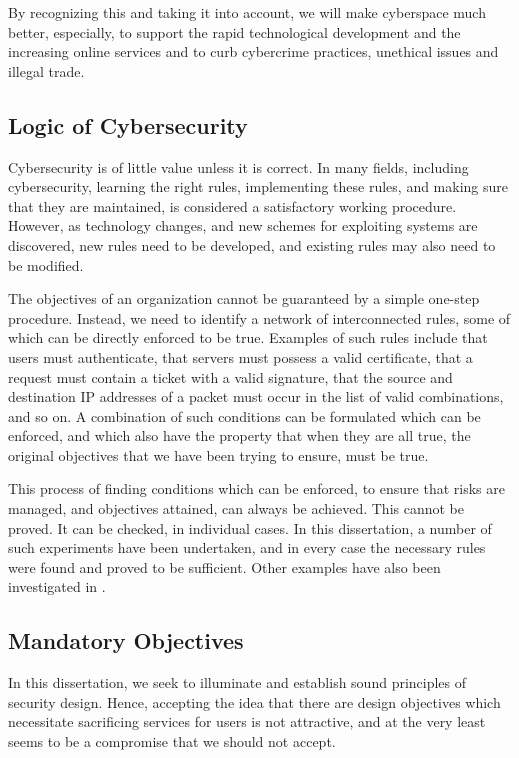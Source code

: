 By recognizing this and taking it into account, we will make cyberspace much better, especially,  to support the rapid technological development and the increasing online services and to curb cybercrime practices, unethical  issues and illegal trade.

\subsection{Logic of Cybersecurity}
 
Cybersecurity is of little value unless it is correct. In many fields,
including cybersecurity, learning the right rules, implementing
these rules, and making sure that they are maintained, is considered
a satisfactory working procedure. However, as technology changes, and
new schemes for exploiting systems are discovered, new rules need to be
developed, and existing rules may also need to be modified.

The objectives of an organization cannot be guaranteed by a simple
one-step procedure. Instead, we need to identify a network of
interconnected rules, some of which can be directly enforced to be
true. Examples of such rules include that users must authenticate, that
servers must possess a valid certificate, that a request must contain
a ticket with a valid signature, that the source and destination IP
addresses of a packet must occur in the list of valid combinations, and
so on. A combination of such conditions can be formulated which can be
enforced, and which also have the property that when they are all true,
the original objectives that we have been trying to ensure, must be true.

This process of finding conditions which can be enforced, to ensure
that risks are managed, and objectives attained, can always be
achieved. This cannot be proved. It can be checked, in individual
cases. In this dissertation,  a number of such experiments have been
undertaken, and in every case the necessary rules were found and
proved to be sufficient. Other examples have also been investigated in
 \cite{Hadaad15,sheniar2018experiments,sheniar2019Graph}.



\subsection{Mandatory Objectives}
In this dissertation,  we seek to illuminate and establish sound principles of security design. Hence, accepting the idea that there are design objectives which necessitate sacrificing services for users is not attractive, and at the very least seems to be a compromise that we should not accept.


